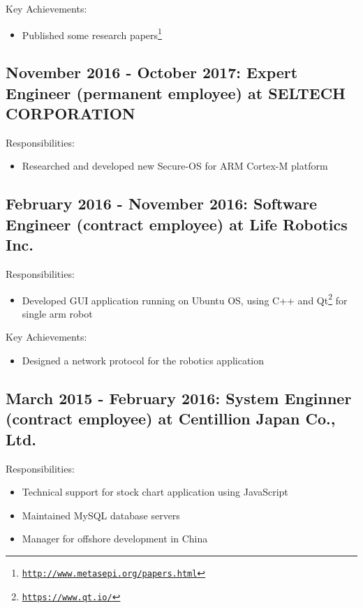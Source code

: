 \documentclass[letterpaper]{article}
\begin{document}
\noindent Key Achievements:

\begin{itemize}
  \item Published some research papers\footnote{\href{http://www.metasepi.org/papers.html}{\tt http://www.metasepi.org/papers.html}}
\end{itemize}

\subsection*{November 2016 - October 2017: Expert Engineer (permanent employee) at SELTECH CORPORATION}

\noindent Responsibilities:

\begin{itemize}
  \item Researched and developed new Secure-OS for ARM Cortex-M platform
\end{itemize}

\subsection*{February 2016 - November 2016: Software Engineer (contract employee) at Life Robotics Inc.}

\noindent Responsibilities:

\begin{itemize}
  \item Developed GUI application running on Ubuntu OS, using C++ and Qt\footnote{\href{https://www.qt.io/}{\tt https://www.qt.io/}} for single arm robot
\end{itemize}

\noindent Key Achievements:

\begin{itemize}
  \item Designed a network protocol for the robotics application
\end{itemize}

\subsection*{March 2015 - February 2016: System Enginner (contract employee) at Centillion Japan Co., Ltd.}

\noindent Responsibilities:

\begin{itemize}
  \item Technical support for stock chart application using JavaScript
  \item Maintained MySQL database servers
  \item Manager for offshore development in China
\end{itemize}
\end{document}

